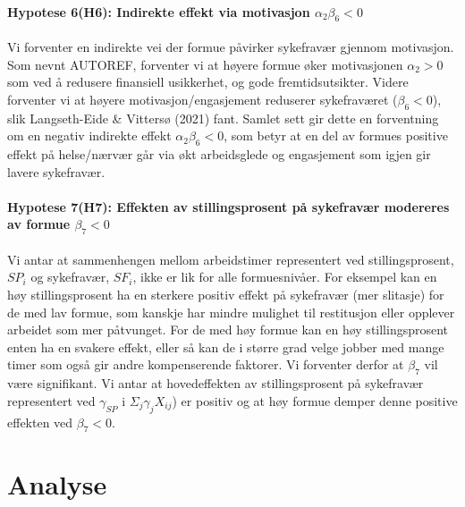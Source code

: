 \documentclass[
  12pt,
  a4paper,
  DIV=11,
  numbers=noendperiod]{scrartcl}
\let\oldparagraph\paragraph
\renewcommand{\paragraph}[1]{\oldparagraph{#1}\mbox{}}
\begin{document}
\paragraph{\texorpdfstring{Hypotese 6(H6): Indirekte effekt via
motivasjon
\(\alpha_2\beta_6 < 0\)}{Hypotese 6(H6): Indirekte effekt via motivasjon \textbackslash alpha\_2\textbackslash beta\_6 \textless{} 0}}\label{hypotese-6h6-indirekte-effekt-via-motivasjon-alpha_2beta_6-0}

Vi forventer en indirekte vei der formue påvirker sykefravær gjennom
motivasjon. Som nevnt AUTOREF, forventer vi at høyere formue øker
motivasjonen \(\alpha_2 > 0\) som ved å redusere finansiell usikkerhet,
og gode fremtidsutsikter. Videre forventer vi at høyere
motivasjon/engasjement reduserer sykefraværet (\(\beta_6 <0\)), slik
Langseth-Eide \& Vittersø (2021) fant. Samlet sett gir dette en
forventning om en negativ indirekte effekt \(\alpha_2 \beta_6 <0\), som
betyr at en del av formues positive effekt på helse/nærvær går via økt
arbeidsglede og engasjement som igjen gir lavere sykefravær.

\paragraph{\texorpdfstring{Hypotese 7(H7): Effekten av stillingsprosent
på sykefravær modereres av formue
\(\beta_7 < 0\)}{Hypotese 7(H7): Effekten av stillingsprosent på sykefravær modereres av formue \textbackslash beta\_7 \textless{} 0}}\label{hypotese-7h7-effekten-av-stillingsprosent-puxe5-sykefravuxe6r-modereres-av-formue-beta_7-0}

Vi antar at sammenhengen mellom arbeidstimer representert ved
stillingsprosent, \(SP_i\) og sykefravær, \(SF_i\), ikke er lik for alle
formuesnivåer. For eksempel kan en høy stillingsprosent ha en sterkere
positiv effekt på sykefravær (mer slitasje) for de med lav formue, som
kanskje har mindre mulighet til restitusjon eller opplever arbeidet som
mer påtvunget. For de med høy formue kan en høy stillingsprosent enten
ha en svakere effekt, eller så kan de i større grad velge jobber med
mange timer som også gir andre kompenserende faktorer. Vi forventer
derfor at \(\beta_7\) vil være signifikant. Vi antar at hovedeffekten av
stillingsprosent på sykefravær representert ved \(\gamma_{SP}\) i
\(\Sigma_j \gamma_{j}X_{ij}\)) er positiv og at høy formue demper denne
positive effekten ved \(\beta_7 < 0\).

\newpage

\section{Analyse}\label{analyse}
\end{document}
